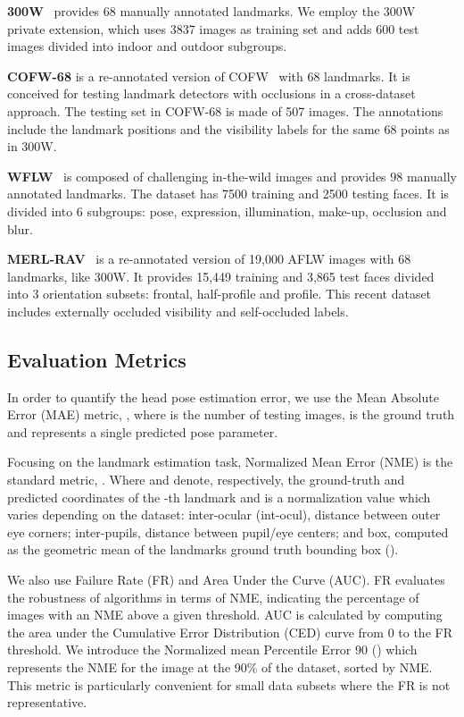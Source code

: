 \documentclass{bmvc2k}
\begin{document}
\textbf{300W}~\cite{Sagonas16} provides 68 manually annotated landmarks.
We employ the 300W private extension, which uses 3837 images as training set and adds 600 test images divided into indoor and outdoor subgroups.

\textbf{COFW-68} is a re-annotated version of COFW~\cite{Burgos13} with 68 landmarks. It is conceived for testing landmark detectors with occlusions in a cross-dataset approach. The testing set in COFW-68 is made of 507 images. The annotations include the landmark positions and the visibility labels for the same 68 points as in 300W.

\textbf{WFLW}~\cite{Wu18lab} is composed of challenging in-the-wild images and provides 98 manually annotated landmarks. The dataset has 7500 training and 2500 testing faces. It is divided into 6 subgroups: pose, expression, illumination, make-up, occlusion and blur.

\textbf{MERL-RAV}~\cite{Kumar20luvli} is a re-annotated version of 19,000 AFLW images with 68 landmarks, like 300W. It provides 15,449 training and 3,865 test faces divided into 3 orientation subsets: frontal, half-profile and profile. This recent dataset includes externally occluded visibility and self-occluded labels. 


\subsection{Evaluation Metrics}
In order to quantify the head pose estimation error, we use the Mean Absolute Error (MAE) metric,
, 
where  is the number of testing images,  is the ground truth and  represents a single predicted pose parameter. 

Focusing on the landmark estimation task, Normalized Mean Error (NME) is the standard metric, 
.
Where  and  denote, respectively, the ground-truth and predicted coordinates of the -th landmark and  is a normalization value which varies depending on the dataset: inter-ocular (int-ocul), distance between outer eye corners; inter-pupils, distance between pupil/eye centers; and box, computed as the geometric mean of the landmarks ground truth bounding box (). 

We also use Failure Rate (FR) and Area Under the Curve (AUC). FR evaluates the robustness of algorithms in terms of NME, indicating the percentage of images with an NME above a given threshold. AUC is calculated by computing the area under the Cumulative Error Distribution (CED) curve from 0 to the FR threshold. We introduce the Normalized mean Percentile Error 90 () which represents the NME for the image at the 90\% of the dataset, sorted by NME. This metric is particularly convenient for small data subsets where the FR is not representative. 
\end{document}
